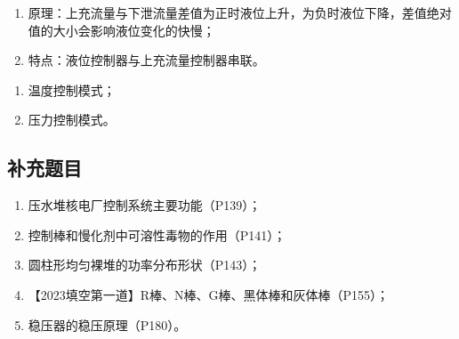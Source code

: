 \begin{exercise} %
    \begin{enumerate}
        \item 原理：上充流量与下泄流量差值为正时液位上升，为负时液位下降，差值绝对值的大小会影响液位变化的快慢；
        \item 特点：液位控制器与上充流量控制器串联。
    \end{enumerate}
\end{exercise}

\begin{exercise} %
    \begin{enumerate}
        \item 温度控制模式；
        \item 压力控制模式。
    \end{enumerate}
\end{exercise}

\subsection{补充题目}

\begin{enumerate}
    \item 压水堆核电厂控制系统主要功能（P139）；
    \item 控制棒和慢化剂中可溶性毒物的作用（P141）；
    \item 圆柱形均匀裸堆的功率分布形状（P143）；
    \item 【2023填空第一道】R棒、N棒、G棒、黑体棒和灰体棒（P155）；
    \item 稳压器的稳压原理（P180）。
\end{enumerate}